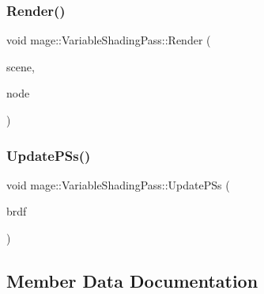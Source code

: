 \hypertarget{classmage_1_1_variable_shading_pass_a03eb92f61b26692521db92af7f78fdaa}{}\label{classmage_1_1_variable_shading_pass_a03eb92f61b26692521db92af7f78fdaa} 
\subsubsection{\texorpdfstring{Render()}{Render()}}
{\footnotesize\ttfamily void mage\+::\+Variable\+Shading\+Pass\+::\+Render (\begin{DoxyParamCaption}\item[{const \hyperlink{structmage_1_1_pass_buffer}{Pass\+Buffer} $\ast$}]{scene,  }\item[{const \hyperlink{classmage_1_1_camera_node}{Camera\+Node} $\ast$}]{node }\end{DoxyParamCaption})}

\hypertarget{classmage_1_1_variable_shading_pass_a4e0a0e7709d99bb94f3263bdf478f484}{}\label{classmage_1_1_variable_shading_pass_a4e0a0e7709d99bb94f3263bdf478f484} 
\subsubsection{\texorpdfstring{Update\+P\+Ss()}{UpdatePSs()}}
{\footnotesize\ttfamily void mage\+::\+Variable\+Shading\+Pass\+::\+Update\+P\+Ss (\begin{DoxyParamCaption}\item[{\hyperlink{namespacemage_ae7a7a03a7b34d7e2689689bb8295cd38}{B\+R\+D\+F\+Type}}]{brdf }\end{DoxyParamCaption})\hspace{0.3cm}{\ttfamily [private]}}



\subsection{Member Data Documentation}
\hypertarget{classmage_1_1_variable_shading_pass_acb1d0d78a9de9afc2d668d87134c5ec5}{}\label{classmage_1_1_variable_shading_pass_acb1d0d78a9de9afc2d668d87134c5ec5} 
